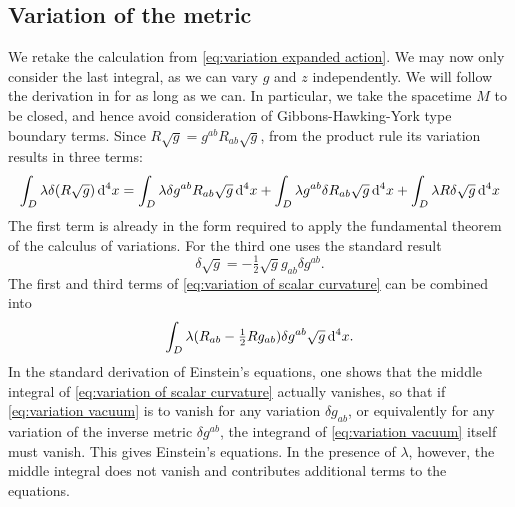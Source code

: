 \documentclass[../main.tex]{subfiles}
\begin{document}
\subsection{Variation of the metric}
We retake the calculation from \cref{eq:variation expanded action}. We may now only consider the last integral, as we can vary \(g\) and \(z\) independently. We will follow the
derivation in \cite{Carroll1997} for as long as we can. In particular, we take the spacetime \(M\) to be closed, and hence avoid consideration of Gibbons-Hawking-York type boundary terms. Since \( R\sqrt{g} =
g^{ab}R_{ab}\sqrt{g} \), from the product rule its variation results in three terms:
\begin{equation}\label{eq:variation of scalar curvature}
	\int_D \lambda \delta(R \sqrt{g}) \,\mathrm{d}^4 x = \int_D \lambda \delta g^{ab} R_{ab} \sqrt{g}
	\,\mathrm{d}^4 x + \int_D \lambda g^{ab} \delta R_{ab} \sqrt{g} \,\mathrm{d}^4 x + \int_{D} \lambda R
	\delta\sqrt{g} \,\mathrm{d}^4 x
\end{equation}
The first term is already in the form required to apply the fundamental theorem of the
calculus of variations. For the third one uses the standard result
\begin{equation*}
	\delta \sqrt{g} = -\tfrac{1}{2}\sqrt{g} g_{ab} \delta g^{ab}.
\end{equation*}
The first and third terms of \cref{eq:variation of scalar curvature} can be combined into
\begin{equation}\label{eq:variation vacuum}
	\int_D \lambda (R_{ab} - \tfrac{1}{2} Rg_{ab}) \delta g^{ab} \sqrt{g} \,\mathrm{d}^4 x.
\end{equation}
In the standard derivation of Einstein's equations, one shows that the middle integral of
\cref{eq:variation of scalar curvature} actually vanishes, so that if \cref{eq:variation
vacuum} is to vanish for any variation \( \delta g_{ab} \), or equivalently for any
variation of the inverse metric \( \delta g^{ab} \), the integrand of \cref{eq:variation vacuum} itself must
vanish. This gives Einstein's equations. In the presence of \( \lambda \), however, the
middle integral does not vanish and contributes additional terms to the
equations.
\end{document}
